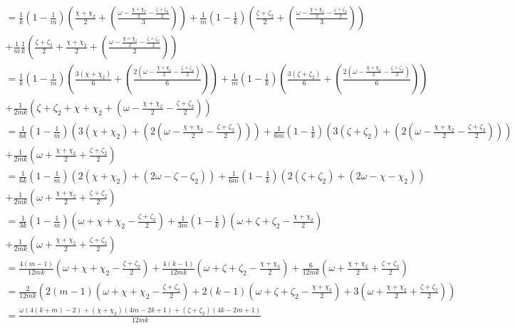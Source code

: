 \documentclass{article}
\begin{document}
\begin{align*}
=
\frac{1}{k}\left (1- \frac{1}{m} \right )
\left(\frac{\chi+\chi_{2}}{2}
+
\left(
\frac{\omega-\frac{\chi+\chi_{2}}{2}-\frac{\zeta+\zeta_{2}}{2}}{3}
\right)
\right) 
+
\frac{1}{m}\left (1- \frac{1}{k} \right )
\left(\frac{\zeta+\zeta_{2}}{2}
+
\left(
\frac{\omega-\frac{\chi+\chi_{2}}{2}-\frac{\zeta+\zeta_{2}}{2}}{3}
\right)
\right) 
\\
+
\frac{1}{m}\frac{1}{k} 
\left(\frac{\zeta+\zeta_{2}}{2}
+
\frac{\chi+\chi_{2}}{2}
+
\left(
\frac{\omega-\frac{\chi+\chi_{2}}{2}-\frac{\zeta+\zeta_{2}}{2}}{2}
\right)
\right) 
\\ 
=
\frac{1}{k}\left (1- \frac{1}{m} \right )
\left(\frac{3(\chi+\chi_{2})}{6}
+
\left(
\frac{2\left(\omega-\frac{\chi+\chi_{2}}{2}-\frac{\zeta+\zeta_{2}}{2}\right)}{6}
\right)
\right) 
+
\frac{1}{m}\left (1- \frac{1}{k} \right )
\left(\frac{3(\zeta+\zeta_{2})}{6}
+
\left(
\frac{2\left(\omega-\frac{\chi+\chi_{2}}{2}-\frac{\zeta+\zeta_{2}}{2}\right)}{6}
\right)
\right) 
\\
+
\frac{1}{2mk} 
\left(\zeta+\zeta_{2}
+
\chi+\chi_{2}
+
\left(
\omega-\frac{\chi+\chi_{2}}{2}-\frac{\zeta+\zeta_{2}}{2}
\right)
\right) \\
=
\frac{1}{6k}\left (1- \frac{1}{m} \right )
\left(3(\chi+\chi_{2})
+
\left(
2\left(\omega-\frac{\chi+\chi_{2}}{2}-\frac{\zeta+\zeta_{2}}{2}\right)
\right)
\right) 
+
\frac{1}{6m}\left (1- \frac{1}{k} \right )
\left(3(\zeta+\zeta_{2})
+
\left(
2\left(\omega-\frac{\chi+\chi_{2}}{2}-\frac{\zeta+\zeta_{2}}{2}\right)
\right)
\right) 
\\
+
\frac{1}{2mk} 
\left(
\omega+\frac{\chi+\chi_{2}}{2}+\frac{\zeta+\zeta_{2}}{2}
\right) \\
=
\frac{1}{6k}\left (1- \frac{1}{m} \right )
\left(2(\chi+\chi_{2})
+
\left(2\omega-\zeta-\zeta_{2}\right)
\right) 
+
\frac{1}{6m}\left (1- \frac{1}{k} \right )
\left(2(\zeta+\zeta_{2})
+
\left(2\omega-\chi-\chi_{2}\right)
\right) 
\\
+
\frac{1}{2mk} 
\left(
\omega+\frac{\chi+\chi_{2}}{2}+\frac{\zeta+\zeta_{2}}{2}
\right) \\
=
\frac{1}{3k}\left (1- \frac{1}{m} \right )
\left(\omega+\chi+\chi_{2} -\frac{\zeta+\zeta_{2}}{2}
\right) 
+
\frac{1}{3m}\left (1- \frac{1}{k} \right )
\left(\omega+\zeta+\zeta_{2}-\frac{\chi+\chi_{2}}{2}
\right) 
\\
+
\frac{1}{2mk} 
\left(
\omega+\frac{\chi+\chi_{2}}{2}+\frac{\zeta+\zeta_{2}}{2}
\right) \\
= 
\frac{4(m-1)}{12mk}
\left(\omega+\chi+\chi_{2} -\frac{\zeta+\zeta_{2}}{2}
\right) 
+
\frac{4(k-1)}{12mk}
\left(\omega+\zeta+\zeta_{2}-\frac{\chi+\chi_{2}}{2}
\right) 
+
\frac{6}{12mk} 
\left(
\omega+\frac{\chi+\chi_{2}}{2}+\frac{\zeta+\zeta_{2}}{2}
\right) \\
= 
\frac{2}{12mk}\left(
2(m-1)
\left(\omega+\chi+\chi_{2} -\frac{\zeta+\zeta_{2}}{2}
\right) 
+
2(k-1)
\left(\omega+\zeta+\zeta_{2}-\frac{\chi+\chi_{2}}{2}
\right) 
+
3
\left(
\omega+\frac{\chi+\chi_{2}}{2}+\frac{\zeta+\zeta_{2}}{2}
\right) 
\right) \\
= 
\frac{\omega(4(k+m)-2)+(\chi+\chi_2)(4m-2k+1)+(\zeta+\zeta_2)(4k-2m+1)}{12mk}
\end{align*} 
\end{document}
